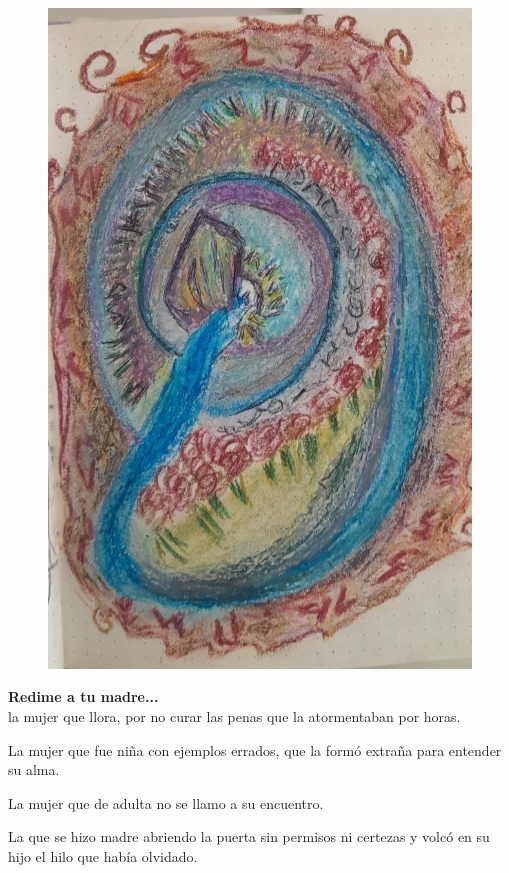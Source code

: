 \documentclass[12pt, a4paper, twoside]{book} %
\begin{document}
\begin{figure}[H]
	\centering
	\includegraphics[width=\textwidth]{./images/1f81324dd8b935.jpg}
\end{figure}

\noindent\textbf{Redime a tu madre...}\\
la mujer que llora, por no curar las penas que la atormentaban  por horas.

La mujer que fue niña con ejemplos errados, que la formó extraña para entender su alma.

La mujer que de adulta no se llamo a su encuentro.

La que se hizo madre abriendo la puerta sin permisos ni certezas y volcó en su hijo el hilo que había olvidado.
\end{document}
